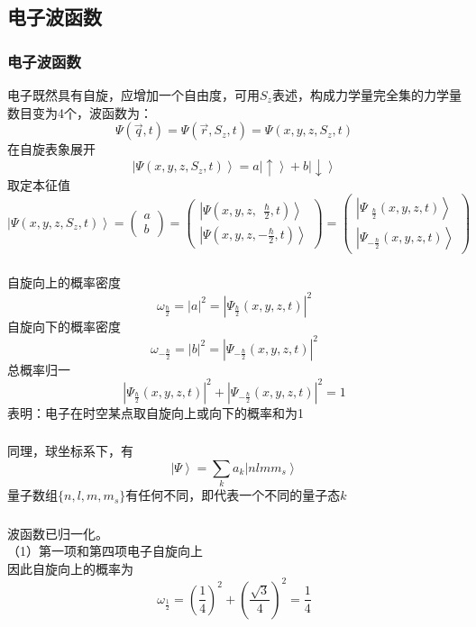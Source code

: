 \subsection{电子波函数}
\begin{frame}[label=current]
  \frametitle{电子波函数}
  电子既然具有自旋，应增加一个自由度，可用$S_z$表述，构成力学量完全集的力学量数目变为4个，波函数为：
  \[ \Psi(\vec{q},t) = \Psi(\vec{r},S_z, t) = \Psi(x,y,z,S_z, t) \]
  在自旋表象展开
  \[\left\vert \Psi(x,y,z,S_z, t) \right\rangle  = a \left\vert \uparrow \right\rangle + b \left\vert \downarrow \right\rangle \]
  取定本征值
  \[\left\vert \Psi(x,y,z,S_z, t) \right\rangle  = \begin{pmatrix}
    a\\
    b 
   \end{pmatrix} = \begin{pmatrix}
    \left\vert \Psi(x,y,z,~~\frac{\hbar}{2}, t) \right\rangle\\
    \left\vert \Psi(x,y,z,-\frac{\hbar}{2}, t) \right\rangle
   \end{pmatrix} = \begin{pmatrix}
    \left\vert \Psi _{~~\frac{\hbar}{2}}(x,y,z,t) \right\rangle\\
    \left\vert \Psi_{-\frac{\hbar}{2}}(x,y,z,t) \right\rangle
   \end{pmatrix}  \]
\end{frame} 

\begin{frame}[label=current]
  \frametitle{}
自旋向上的概率密度
\[ \omega _{\frac{\hbar}{2}} = \left\vert a\right\vert^2 =\left\vert\Psi _{\frac{\hbar}{2}}(x,y,z,t)\right\vert^2\]
自旋向下的概率密度
\[ \omega _{-\frac{\hbar}{2}} = \left\vert b\right\vert^2 =\left\vert\Psi _{-\frac{\hbar}{2}}(x,y,z,t)\right\vert^2\]
总概率归一
\[ \left\vert\Psi _{\frac{\hbar}{2}}(x,y,z,t)\right\vert^2+ \left\vert\Psi _{-\frac{\hbar}{2}}(x,y,z,t)\right\vert^2 =1\]
表明：电子在时空某点取自旋向上或向下的概率和为1
\end{frame} 

\begin{frame}[label=current]
  \frametitle{}
同理，球坐标系下，有
\[\left\vert \Psi\right\rangle = \sum_k a_k \left\vert nlmm_s\right\rangle \]
量子数组$\{n,l,m,m_s\}$有任何不同，即代表一个不同的量子态$k$
\end{frame} 

\begin{frame}[label=current]
  \frametitle{}
\解 波函数已归一化。\\
（1）第一项和第四项电子自旋向上 \\
因此自旋向上的概率为
\[\omega _{\frac{1}{2}} = (\frac{1}{4})^2 + (\frac{\sqrt{3 } }{4})^2 = \frac{1}{4}\]
\end{frame} 

